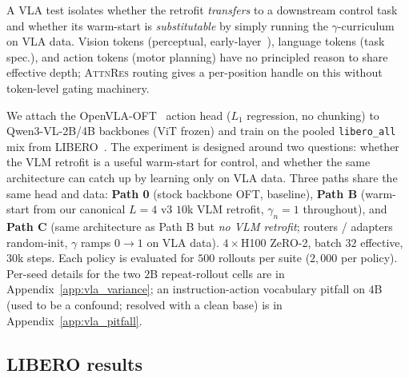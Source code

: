 \documentclass{article}
\newcommand{\attnres}{\textsc{AttnRes}}
\begin{document}
A VLA test isolates whether the retrofit \emph{transfers} to a downstream control task and whether its warm-start is \emph{substitutable} by simply running the $\gamma$-curriculum on VLA data. Vision tokens (perceptual, early-layer~\citep{raghu2021vision}), language tokens (task spec.), and action tokens (motor planning) have no principled reason to share effective depth; \attnres{} routing gives a per-position handle on this without token-level gating machinery.

We attach the OpenVLA-OFT~\citep{kim2025openvlaoft} action head ($L_1$ regression, no chunking) to Qwen3-VL-2B/4B backbones (ViT frozen) and train on the pooled \texttt{libero\_all} mix from LIBERO~\citep{liu2023libero}. The experiment is designed around two questions: whether the VLM retrofit is a useful warm-start for control, and whether the same architecture can catch up by learning only on VLA data. Three paths share the same head and data: \textbf{Path 0} (stock backbone OFT, baseline), \textbf{Path B} (warm-start from our canonical $L{=}4$ v3 $10$k VLM retrofit, $\gamma_n{=}1$ throughout), and \textbf{Path C} (same architecture as Path B but \emph{no VLM retrofit}; routers / adapters random-init, $\gamma$ ramps $0{\to}1$ on VLA data). $4{\times}$H100 ZeRO-2, batch $32$ effective, $30$k steps. Each policy is evaluated for $500$ rollouts per suite ($2{,}000$ per policy). Per-seed details for the two $2$B repeat-rollout cells are in Appendix~\ref{app:vla_variance}; an instruction-action vocabulary pitfall on $4$B (used to be a confound; resolved with a clean base) is in Appendix~\ref{app:vla_pitfall}.

\subsection{LIBERO results}
\label{sec:vla_results}
\end{document}
